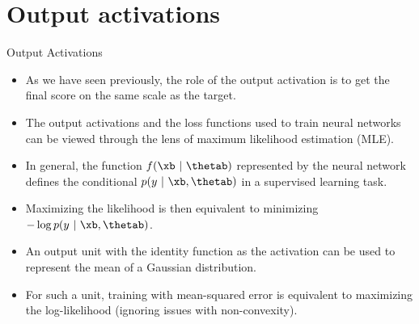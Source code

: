 
\section{Output activations}

\begin{frame} {Output Activations}
  \begin{itemize}
    \item As we have seen previously, the role of the output activation is to get the final score on the same scale as the target.
    \item The output activations and the loss functions used to train neural networks can be viewed through the lens of maximum likelihood estimation (MLE).
    \item In general, the function $f(\xb~|~\thetab)$ represented by the neural network defines the conditional $p(y~|~\xb,\thetab)$ in a supervised learning task.
    \item Maximizing the likelihood is then equivalent to minimizing $- \log p(y~|~\xb,\thetab)$.
    \item An output unit with the identity function as the activation can be used to represent the mean of a Gaussian distribution.
    \item For such a unit, training with mean-squared error is equivalent to maximizing the log-likelihood (ignoring issues with non-convexity).
  \end{itemize}
\end{frame}


